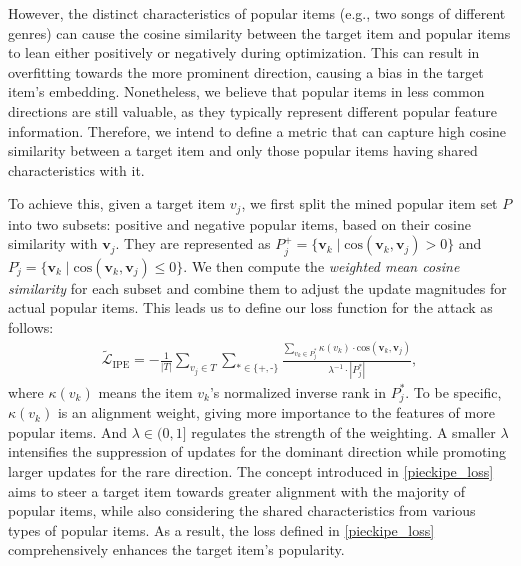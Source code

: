 However, the distinct characteristics of popular items (e.g., two songs of different genres) can cause the cosine similarity between the target item and popular items to lean either positively or negatively during optimization. 
This can result in overfitting towards the more prominent direction, causing a bias in the target item's embedding. 
Nonetheless, we believe that popular items in less common directions are still valuable, as they typically represent different popular feature information. Therefore, we intend to define a metric that can capture high cosine similarity between a target item and only those popular items having shared characteristics with it.

To achieve this, given a target item $v_j$, we first split the mined popular item set ${P}$ into two subsets: positive and negative popular items, based on their cosine similarity with $\mathbf{v}_j$.
They are represented as ${P}^\text{+}_j = \{\mathbf{v}_k \mid \text{cos}(\mathbf{v}_k, \mathbf{v}_j) > 0\}$ and ${P}^\text{-}_j = \{\mathbf{v}_k \mid \text{cos}(\mathbf{v}_k, \mathbf{v}_j) \leq 0\}$.
We then compute the \emph{weighted mean cosine similarity} for each subset and combine them to adjust the update magnitudes for actual popular items. This leads us to define our loss function for the attack as follows:
\begin{equation} \label{pieckipe_loss}
\begin{aligned}
\tilde{\mathcal{L}}_{\text{IPE}} = -\frac{1}{|{T}|} \sum\limits_{v_j \in {T}} \sum\limits_{\text{*}\in\{\text{+},\text{-}\}}\frac{\sum\nolimits_{v_k\in{P}^\text{*}_j} \kappa(v_k) \cdot \text{cos}(\mathbf{v}_k,\mathbf{v}_j)}{\lambda^{-1} \cdot|{P}^\text{*}_j|},
\end{aligned}
\end{equation}
where $\kappa(v_k)$ means the item $v_k$'s normalized inverse rank in ${P}_j^{*}$.
To be specific, $\kappa(v_k)$ is an alignment weight, giving more importance to the features of more popular items.
And $\lambda \in (0,1]$ regulates the strength of the weighting.
A smaller $\lambda$ intensifies the suppression of updates for the dominant direction while promoting larger updates for the rare direction.
The concept introduced in \cref{pieckipe_loss} aims to steer a target item towards greater alignment with the majority of popular items, while also considering the shared characteristics from various types of popular items. As a result, the loss defined in \cref{pieckipe_loss} comprehensively enhances the target item's popularity.

